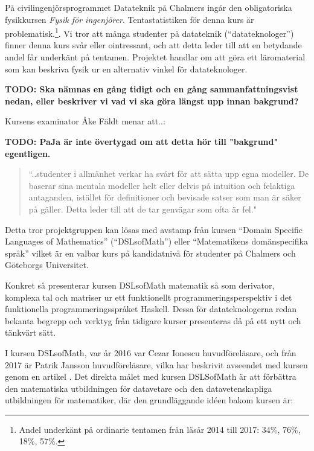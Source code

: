\begin{draft}

På civilingenjörsprogrammet Datateknik på Chalmers ingår den obligatoriska
fysikkursen \textit{Fysik för ingenjörer}.  Tentastatistiken för denna kurs är
problematisk.\footnote{Andel underkänt på ordinarie tentamen från läsår 2014
till 2017: 34\%, 76\%, 18\%, 57\%. }\cite{tentastatistik}. Vi tror att många
studenter på datateknik (``datateknologer'') finner denna kurs svår eller
ointressant, och att detta leder till att en betydande andel får underkänt på
tentamen.  Projektet handlar om att göra ett läromaterial som kan beskriva fysik
ur en alternativ vinkel för datateknologer. 

\textbf{TODO: Ska nämnas en gång tidigt och en gång sammanfattningsvist nedan,
eller beskriver vi vad vi ska göra längst upp innan bakgrund?}

Kursens examinator Åke Fäldt menar att..:

\textbf{TODO: PaJa är inte övertygad om att detta hör till "bakgrund"
egentligen.}

\begin{quote} ``..studenter i allmänhet verkar ha svårt för att sätta upp egna
  modeller. De baserar sina mentala modeller helt eller delvis på intuition och
  felaktiga antaganden, istället för definitioner och bevisade satser som man är
  säker på gäller. Detta leder till att de tar genvägar som ofta är fel."
\end{quote}

Detta tror projektgruppen kan lösas med avstamp från kursen ``Domain Specific
Languages of Mathematics'' (``DSLsofMath'') eller ``Matematikens domänspecifika
språk'' vilket är en valbar kurs på kandidatnivå för studenter på Chalmers och
Göteborgs Universitet.

Konkret så presenterar kursen DSLsofMath matematik så som derivator, komplexa
tal och matriser ur ett funktionellt programmeringsperspektiv i det funktionella
programmeringsspråket Haskell. Dessa för datateknologerna redan bekanta begrepp
och verktyg från tidigare kurser presenteras då på ett nytt och tänkvärt sätt.

I kursen DSLsofMath, var år 2016 var Cezar Ionescu huvudföreläsare, och från
2017 är Patrik Jansson huvudföreläsare, vilka har beskrivit avseendet med kursen
genom en artikel \cite{tfpie2015}. Det direkta målet med kursen DSLSofMath är
att förbättra den matematiska utbildningen för datavetare och den
datavetenskapliga utbildningen för matematiker, där den grundläggande idéen
bakom kursen är:


\end{draft}

